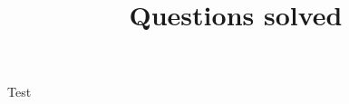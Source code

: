 \documentclass[12pt]{article}
\title{Questions solved}
\begin{document}
\maketitle

Test
\end{document}
